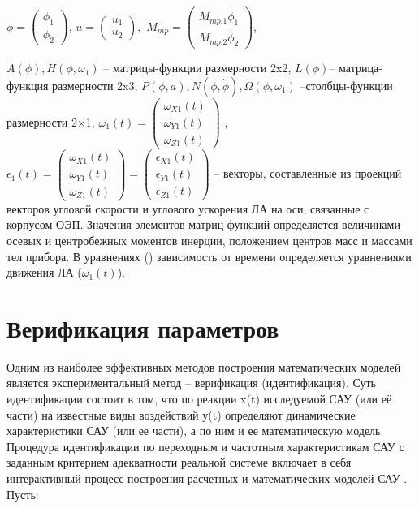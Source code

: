 $\phi{}=\left(\begin{array}{
	cc}
{\phi{}}_1 \\
{\phi{}}_2
\end{array}\right)$,     $u=\left(\begin{array}{
	cc}
u_1 \\
u_2
\end{array}\right),$   $M_{mp}=\left(\begin{array}{
	cc}
M_{\textit{mp.1}} \dot{\phi_1}   \\
M_{\textit{mp.2}} \dot{\phi_2}
\end{array}\right)$,

$A\left(\phi{}\right),H\left(\phi{},{\omega{}}_1\right)$ – матрицы-функции  размерности 2x2, $L(\phi)$– матрица-функция размерности 2x3,
$P\left(\phi{},a\right),N\left(\phi{},\dot{\phi{}}\right),\Omega{}\left(\phi{},{\omega{}}_1\right)$ –столбцы-функции размерности 2×1,
${\omega{}}_1(t)=\left(\begin{array}{
	ccc}
{\omega{}}_{X1}(t) \\
{\omega{}}_{Y1}(t) \\
{\omega{}}_{Z1}(t)
\end{array}\right)$
,    ${\epsilon{}}_1(t)=\left(\begin{array}{
	ccc}
{\dot{\omega{}}}_{X1}(t) \\
{\dot{\omega{}}}_{Y1}(t) \\
{\dot{\omega{}}}_{Z1}(t)
\end{array}\right)=\left(\begin{array}{
	ccc}
{\epsilon{}}_{X1}(t) \\
{\epsilon{}}_{Y1}(t) \\
{\epsilon{}}_{Z1}(t)
\end{array}\right)$
– векторы, составленные из проекций векторов угловой скорости и углового ускорения ЛА  на оси, связанные с корпусом ОЭП. Значения элементов матриц-функций определяется величинами осевых и центробежных моментов инерции, положением центров масс и массами тел прибора. В уравнениях () зависимость от времени определяется уравнениями движения ЛА ($\omega_1(t)$).

\section{Верификация параметров} \label{sec:ch2/sec4}

Одним из наиболее эффективных методов построения математических моделей является экспериментальный метод – верификация (идентификация). Суть идентификации состоит в том, что по реакции x(t) исследуемой САУ (или её части) на известные виды воздействий у(t) определяют динамические характеристики САУ (или ее части), а по ним и ее математическую модель. Процедура идентификации по переходным и частотным характеристикам САУ с заданным критерием адекватности реальной системе включает в себя интерактивный процесс построения расчетных и математических моделей САУ \cite[]{Karpov}. Пусть:

